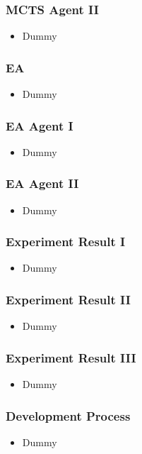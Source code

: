 \documentclass{beamer}
\begin{document}
\begin{frame}
\frametitle{MCTS Agent II}
\begin{itemize}
 \item Dummy
\end{itemize}
\end{frame}


\begin{frame}
\frametitle{EA}
\begin{itemize}
 \item Dummy
\end{itemize}
\end{frame}


\begin{frame}
\frametitle{EA Agent I}
\begin{itemize}
 \item Dummy
\end{itemize}
\end{frame}

\begin{frame}
\frametitle{EA Agent II}
\begin{itemize}
 \item Dummy
\end{itemize}
\end{frame}


\begin{frame}
\frametitle{Experiment Result I}
\begin{itemize}
 \item Dummy
\end{itemize}
\end{frame}

\begin{frame}
\frametitle{Experiment Result II}
\begin{itemize}
 \item Dummy
\end{itemize}
\end{frame}


\begin{frame}
\frametitle{Experiment Result III}
\begin{itemize}
 \item Dummy
\end{itemize}
\end{frame}



\begin{frame}
\frametitle{Development Process}
\begin{itemize}
 \item Dummy
\end{itemize}
\end{frame}
\end{document}
